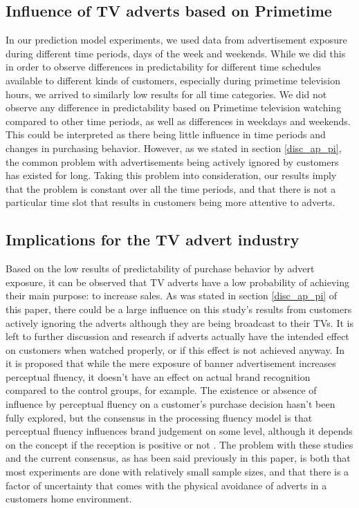 \documentclass[review]{elsarticle}
\begin{document}
\subsection{Influence of TV adverts based on Primetime}
\label{disc_prime}

In our prediction model experiments, we used data from advertisement exposure during different time periods, days of the week and weekends. While we did this in order to observe differences in predictability for different time schedules available to different kinds of customers, especially during primetime television hours, we arrived to similarly low results for all time categories. We did not observe any difference in predictability based on Primetime television watching compared to other time periods, as well as differences in weekdays and weekends. This could be interpreted as there being little influence in time periods and changes in purchasing behavior. However, as we stated in section \ref{disc_ap_pi}, the common problem with advertisements being actively ignored by customers has existed for long. Taking this problem into consideration, our results imply that the problem is constant over all the time periods, and that there is not a particular time slot that results in customers being more attentive to adverts.

\subsection{Implications for the TV advert industry}
\label{disc_advert}

Based on the low results of predictability of purchase behavior by advert exposure, it can be observed that TV adverts have a low probability of achieving their main purpose: to increase sales. As was stated in section \ref{disc_ap_pi} of this paper, there could be a large influence on this study's results from customers actively ignoring the adverts although they are being broadcast to their TVs. It is left to further discussion and research if adverts actually have the intended effect on customers when watched properly, or if this effect is not achieved anyway. In \cite{14} it is proposed that while the mere exposure of banner advertisement increases perceptual fluency, it doesn't have an effect on actual brand recognition compared to the control groups, for example. The existence or absence of influence by perceptual fluency on a customer's purchase decision hasn't been fully explored, but the consensus in the processing fluency model is that perceptual fluency influences brand judgement on some level, although it depends on the concept if the reception is positive or not \cite{21}. The problem with these studies and the current consensus, as has been said previously in this paper, is both that most experiments are done with relatively small sample sizes, and that there is a factor of uncertainty that comes with the physical avoidance of adverts in a customers home environment.
\end{document}
